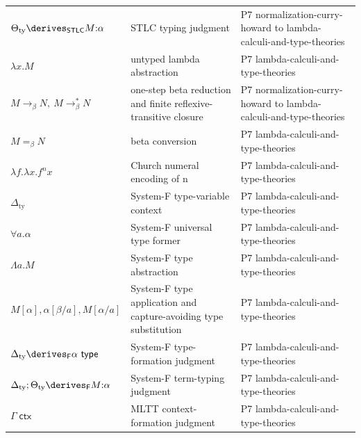 \begin{longtable}{@{}p{}p{}p{}@{}}
\(\Theta_{\mathrm{ty}}\derives_{\mathsf{STLC}}M{:}\alpha\) & STLC typing judgment & P7 normalization-\allowbreak{}curry-\allowbreak{}howard to lambda-\allowbreak{}calculi-\allowbreak{}and-\allowbreak{}type-\allowbreak{}theories \\
\(\lambda x.M\) & untyped lambda abstraction & P7 lambda-\allowbreak{}calculi-\allowbreak{}and-\allowbreak{}type-\allowbreak{}theories \\
\(M\longrightarrow_{\beta}N,\allowbreak \ M\longrightarrow_{\beta}^{*}N\) & one-step beta reduction and finite reflexive-transitive closure & P7 normalization-\allowbreak{}curry-\allowbreak{}howard to lambda-\allowbreak{}calculi-\allowbreak{}and-\allowbreak{}type-\allowbreak{}theories \\
\(M=_{\beta}N\) & beta conversion & P7 lambda-\allowbreak{}calculi-\allowbreak{}and-\allowbreak{}type-\allowbreak{}theories \\
\(\lambda f.\lambda x.f^n x\) & Church numeral encoding of n & P7 lambda-\allowbreak{}calculi-\allowbreak{}and-\allowbreak{}type-\allowbreak{}theories \\
\(\Delta_{\mathrm{ty}}\) & System-F type-variable context & P7 lambda-\allowbreak{}calculi-\allowbreak{}and-\allowbreak{}type-\allowbreak{}theories \\
\(\forall a.\alpha\) & System-F universal type former & P7 lambda-\allowbreak{}calculi-\allowbreak{}and-\allowbreak{}type-\allowbreak{}theories \\
\(\Lambda a.M\) & System-F type abstraction & P7 lambda-\allowbreak{}calculi-\allowbreak{}and-\allowbreak{}type-\allowbreak{}theories \\
\(M[\alpha],\allowbreak \alpha[\beta/a],\allowbreak M[\alpha/a]\) & System-F type application and capture-avoiding type substitution & P7 lambda-\allowbreak{}calculi-\allowbreak{}and-\allowbreak{}type-\allowbreak{}theories \\
\(\Delta_{\mathrm{ty}}\derives_{\mathsf F}\alpha\ \mathsf{type}\) & System-F type-formation judgment & P7 lambda-\allowbreak{}calculi-\allowbreak{}and-\allowbreak{}type-\allowbreak{}theories \\
\(\Delta_{\mathrm{ty}};\allowbreak \Theta_{\mathrm{ty}}\derives_{\mathsf F}M{:}\alpha\) & System-F term-typing judgment & P7 lambda-\allowbreak{}calculi-\allowbreak{}and-\allowbreak{}type-\allowbreak{}theories \\
\(\Gamma\;\mathsf{ctx}\) & MLTT context-formation judgment & P7 lambda-\allowbreak{}calculi-\allowbreak{}and-\allowbreak{}type-\allowbreak{}theories \\

\end{longtable}
